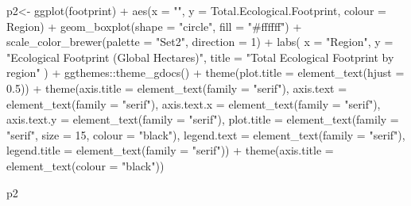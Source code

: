 \documentclass[
]{article}
\newenvironment{Shaded}{\begin{snugshade}}{\end{snugshade}}
\newcommand{\AttributeTok}[1]{\textcolor[rgb]{0.77,0.63,0.00}{#1}}
\newcommand{\DecValTok}[1]{\textcolor[rgb]{0.00,0.00,0.81}{#1}}
\newcommand{\FloatTok}[1]{\textcolor[rgb]{0.00,0.00,0.81}{#1}}
\newcommand{\FunctionTok}[1]{\textcolor[rgb]{0.00,0.00,0.00}{#1}}
\newcommand{\NormalTok}[1]{#1}
\newcommand{\OtherTok}[1]{\textcolor[rgb]{0.56,0.35,0.01}{#1}}
\newcommand{\SpecialCharTok}[1]{\textcolor[rgb]{0.00,0.00,0.00}{#1}}
\newcommand{\StringTok}[1]{\textcolor[rgb]{0.31,0.60,0.02}{#1}}
\begin{document}
\begin{Shaded}
\begin{Highlighting}[]
\NormalTok{p2}\OtherTok{\textless{}{-}} \FunctionTok{ggplot}\NormalTok{(footprint) }\SpecialCharTok{+}
  \FunctionTok{aes}\NormalTok{(}\AttributeTok{x =} \StringTok{""}\NormalTok{, }\AttributeTok{y =}\NormalTok{ Total.Ecological.Footprint, }\AttributeTok{colour =}\NormalTok{ Region) }\SpecialCharTok{+}
  \FunctionTok{geom\_boxplot}\NormalTok{(}\AttributeTok{shape =} \StringTok{"circle"}\NormalTok{, }\AttributeTok{fill =} \StringTok{"\#ffffff"}\NormalTok{) }\SpecialCharTok{+}
  \FunctionTok{scale\_color\_brewer}\NormalTok{(}\AttributeTok{palette =} \StringTok{"Set2"}\NormalTok{, }\AttributeTok{direction =} \DecValTok{1}\NormalTok{) }\SpecialCharTok{+}
  \FunctionTok{labs}\NormalTok{(}
    \AttributeTok{x =} \StringTok{"Region"}\NormalTok{,}
    \AttributeTok{y =} \StringTok{"Ecological Footprint (Global Hectares)"}\NormalTok{,}
    \AttributeTok{title =} \StringTok{"Total Ecological Footprint by region"}
\NormalTok{  ) }\SpecialCharTok{+}
\NormalTok{  ggthemes}\SpecialCharTok{::}\FunctionTok{theme\_gdocs}\NormalTok{() }\SpecialCharTok{+}
  \FunctionTok{theme}\NormalTok{(}\AttributeTok{plot.title =} \FunctionTok{element\_text}\NormalTok{(}\AttributeTok{hjust =} \FloatTok{0.5}\NormalTok{)) }\SpecialCharTok{+} \FunctionTok{theme}\NormalTok{(}\AttributeTok{axis.title =} \FunctionTok{element\_text}\NormalTok{(}\AttributeTok{family =} \StringTok{"serif"}\NormalTok{),}
    \AttributeTok{axis.text =} \FunctionTok{element\_text}\NormalTok{(}\AttributeTok{family =} \StringTok{"serif"}\NormalTok{),}
    \AttributeTok{axis.text.x =} \FunctionTok{element\_text}\NormalTok{(}\AttributeTok{family =} \StringTok{"serif"}\NormalTok{),}
    \AttributeTok{axis.text.y =} \FunctionTok{element\_text}\NormalTok{(}\AttributeTok{family =} \StringTok{"serif"}\NormalTok{),}
    \AttributeTok{plot.title =} \FunctionTok{element\_text}\NormalTok{(}\AttributeTok{family =} \StringTok{"serif"}\NormalTok{,}
        \AttributeTok{size =} \DecValTok{15}\NormalTok{, }\AttributeTok{colour =} \StringTok{"black"}\NormalTok{), }\AttributeTok{legend.text =} \FunctionTok{element\_text}\NormalTok{(}\AttributeTok{family =} \StringTok{"serif"}\NormalTok{),}
    \AttributeTok{legend.title =} \FunctionTok{element\_text}\NormalTok{(}\AttributeTok{family =} \StringTok{"serif"}\NormalTok{)) }\SpecialCharTok{+} \FunctionTok{theme}\NormalTok{(}\AttributeTok{axis.title =} \FunctionTok{element\_text}\NormalTok{(}\AttributeTok{colour =} \StringTok{"black"}\NormalTok{))}

\NormalTok{p2 }
\end{Highlighting}
\end{Shaded}
\end{document}
